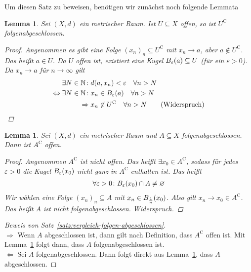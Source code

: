 \documentclass[11pt, twoside, a4paper]{article}
\theoremstyle{plain}
\newtheorem{lemma}[blockelement]{Lemma}
\numberwithin{equation}{subsection}
\newcommand{\pair}[1]{\left(#1\right)}
\newcommand{\of}[1]{\mathopen{}\mathclose{}\bgroup\left(#1\aftergroup\egroup\right)}
\newcommand{\equivalent}[0]{\Leftrightarrow{}}
\newcommand{\impl}[0]{\Rightarrow{}}
\newcommand{\fromto}{\rightarrow{}}
\renewcommand{\emptyset}{\varnothing}
\newcommand{\ntoinf}[0]{n\fromto\infty}
\newcommand{\anf}[1]{\glqq{}#1\grqq}
\newcommand{\N}{\mathbb{N}}
\begin{document}
    Um diesen Satz zu beweisen, benötigen wir zunächst noch folgende Lemmata

    \begin{lemma} %
        \label{lemma:komplement-folgen-abgeschlossen}
        Sei $\pair{X, d}$ ein metrischer Raum. Ist $U\subseteq X$ offen, so ist $U^{\mathrm{C}}$ folgenabgeschlossen.

        \begin{proof}
            Angenommen es gibt eine Folge $(x_n)_n \subseteq U^{\mathrm{C}}$ mit $x_n\fromto a$, aber $a\not\in U^{\mathrm{C}}$. Das heißt $a\in U$. Da $U$ offen ist, existiert eine Kugel $B_{\varepsilon}\of{a} \subseteq U$ (für ein $\varepsilon > 0$). Da $x_n\fromto a$ für $\ntoinf$ gilt
            \begin{align*}
                \exists N\in\N\colon &d\of{a, x_n} < \varepsilon\quad\forall n> N \\
                \equivalent \exists N\in\N\colon &x_n \in B_{\varepsilon}\of{a}\quad\forall n > N\\
                \impl &x_n\not\in U^{\mathrm{C}}\quad\forall n > N\tag*{(Widerspruch)\qedhere}
            \end{align*}
        \end{proof}
    \end{lemma}

    \begin{lemma}
        \label{lemma:komplement-offen}
        Sei $\pair{X, d}$ ein metrischer Raum und $A\subseteq X$ folgenabgeschlossen. Dann ist $A^{\mathrm{C}}$ offen.

        \begin{proof}
            Angenommen $A^{\mathrm{C}}$ ist nicht offen. Das heißt $\exists x_0 \in A^{\mathrm{C}}$, sodass für jedes $\varepsilon > 0$ die Kugel $B_{\varepsilon}\of{x_0}$ nicht ganz in $A^{\mathrm{C}}$ enthalten ist. Das heißt
            \begin{align*}
                \forall\varepsilon > 0\colon B_{\varepsilon}\of{x_0}\cap A \neq \emptyset
            \end{align*}
            Wir wählen eine Folge $(x_n)_n\subseteq A$ mit $x_n\in B_{\frac{1}{n}}\of{x_0}$. Also gilt $x_n\fromto x_0\in A^{\mathrm{C}}$. Das heißt $A$ ist nicht folgenabgeschlossen. Widerspruch.
        \end{proof}
    \end{lemma}

    \begin{proof}[Beweis von Satz~\ref{satz:vergleich-folgen-abgeschlossen}]
        ~\\
        \anf{$\impl$} Wenn $A$ abgeschlossen ist, dann gilt nach Definition, dass $A^{\mathrm{C}}$ offen ist. Mit Lemma~\ref{lemma:komplement-folgen-abgeschlossen} folgt dann, dass $A$ folgenabgeschlossen ist.\\
        \anf{$\Leftarrow$} Sei $A$ folgenabgeschlossen. Dann folgt direkt aus Lemma~\ref{lemma:komplement-offen}, dass $A$ abgeschlossen.
    \end{proof}
\end{document}
